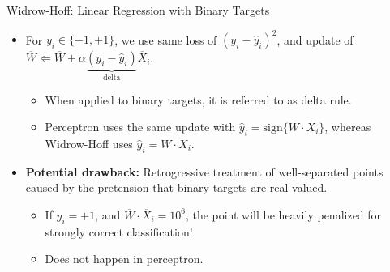 \begin{frame}{Widrow-Hoff: Linear Regression with Binary Targets}
\begin{itemize}
\item For  $y_i \in \{-1,
+1 \}$, we use  same loss of $(y_i -\hat{y}_i)^2$, and update of
$\overline{W} \Leftarrow
 \overline{W}+ \alpha \underbrace{(y_i - \hat{y}_i)}_{\mbox{delta}} \overline{X}_i$.
 \begin{itemize}
 \item When applied to binary targets, it is referred to as delta
 rule.
 \item Perceptron uses the same update with $\hat{y}_i= \mbox{sign} \{
 \overline{W} \cdot \overline{X}_i \}$, whereas Widrow-Hoff uses
 $\hat{y}_i= \overline{W} \cdot \overline{X}_i$.
 \end{itemize}
 \item {\bf Potential drawback:} Retrogressive treatment of
 well-separated points caused by the pretension  that binary targets are real-valued.
 \begin{itemize}
\item If $y_i=+1$, and $\overline{W} \cdot \overline{X}_i =10^6$,
the point will be heavily penalized for strongly correct
classification!
\item Does not happen in perceptron.
\end{itemize}
 \end{itemize}
\end{frame}


